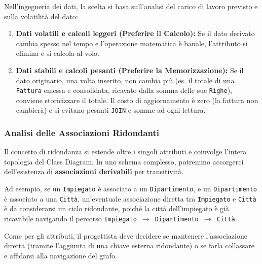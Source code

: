 \begin{tip}
Nell'ingegneria dei dati, la scelta si basa sull'analisi del carico di lavoro previsto e sulla volatilità del dato:
\begin{enumerate}
    \item \textbf{Dati volatili e calcoli leggeri (Preferire il Calcolo):} Se il dato derivato cambia spesso nel tempo e l'operazione matematica è banale, l'attributo si elimina e si calcola al volo.
    \item \textbf{Dati stabili e calcoli pesanti (Preferire la Memorizzazione):} Se il dato originario, una volta inserito, non cambia più (es. il totale di una \texttt{Fattura} emessa e consolidata, ricavato dalla somma delle sue \texttt{Righe}), conviene storicizzare il totale. Il costo di aggiornamento è zero (la fattura non cambierà) e si evitano pesanti \texttt{JOIN} e somme ad ogni lettura.
\end{enumerate}
\end{tip}

\subsubsection*{Analisi delle Associazioni Ridondanti}

Il concetto di ridondanza si estende oltre i singoli attributi e coinvolge l'intera topologia del Class Diagram. In uno schema complesso, potremmo accorgerci dell'esistenza di \textbf{associazioni derivabili} per transitività. 

Ad esempio, se un \texttt{Impiegato} è associato a un \texttt{Dipartimento}, e un \texttt{Dipartimento} è associato a una \texttt{Città}, un'eventuale associazione diretta tra \texttt{Impiegato} e \texttt{Città} è da considerarsi un ciclo ridondante, poiché la città dell'impiegato è già ricavabile navigando il percorso \texttt{Impiegato $\rightarrow$ Dipartimento $\rightarrow$ Città}.

Come per gli attributi, il progettista deve decidere se mantenere l'associazione diretta (tramite l'aggiunta di una chiave esterna ridondante) o se farla collassare e affidarsi alla navigazione del grafo.


